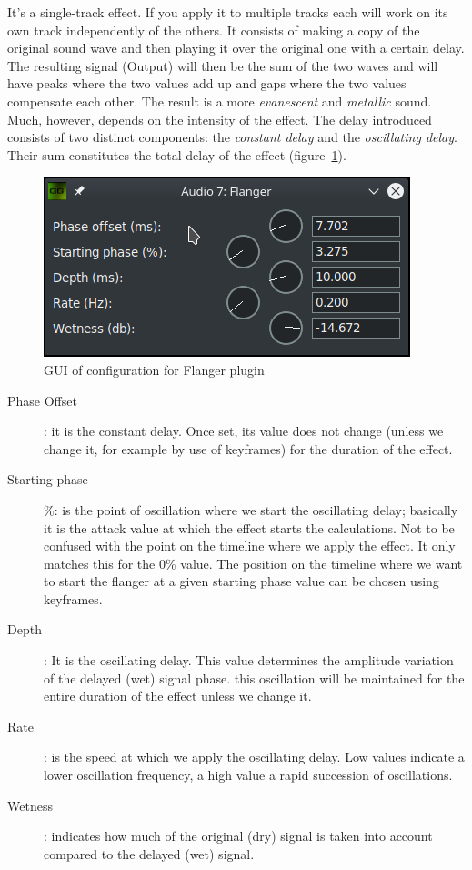 It's a single-track effect. If you apply it to multiple tracks each will work on its own track independently of the others.
It consists of making a copy of the original sound wave and then playing it over the original one with a certain delay. The resulting signal (Output) will then be the sum of the two waves and will have peaks where the two values add up and gaps where the two values compensate each other. The result is a more \textit{evanescent} and \textit{metallic} sound. Much, however, depends on the intensity of the effect.
The delay introduced consists of two distinct components: the \textit{constant delay} and the \textit{oscillating delay}. Their sum constitutes the total delay of the effect (figure~\ref{fig:flanger}).

\begin{figure}[htpb]
	\centering
	\includegraphics[width=0.5\linewidth]{images/flanger.png}
	\caption{GUI of configuration for Flanger plugin}
	\label{fig:flanger}
\end{figure}

\begin{description}
	\item[Phase Offset]: it is the constant delay. Once set, its value does not change (unless we change it, for example by use of keyframes) for the duration of the effect.
	\item[Starting phase] \%: is the point of oscillation where we start the oscillating delay; basically it is the attack value at which the effect starts the calculations. Not to be confused with the point on the timeline where we apply the effect. It only matches this for the 0\% value. The position on the timeline where we want to start the flanger at a given starting phase value can be chosen using keyframes.
	\item[Depth]: It is the oscillating delay. This value determines the amplitude variation of the delayed (wet) signal phase. this oscillation will be maintained for the entire duration of the effect unless we change it.
	\item[Rate]: is the speed at which we apply the oscillating delay. Low values indicate a lower oscillation frequency, a high value a rapid succession of oscillations.
	\item[Wetness]: indicates how much of the original (dry) signal is taken into account compared to the delayed (wet) signal.
\end{description}

